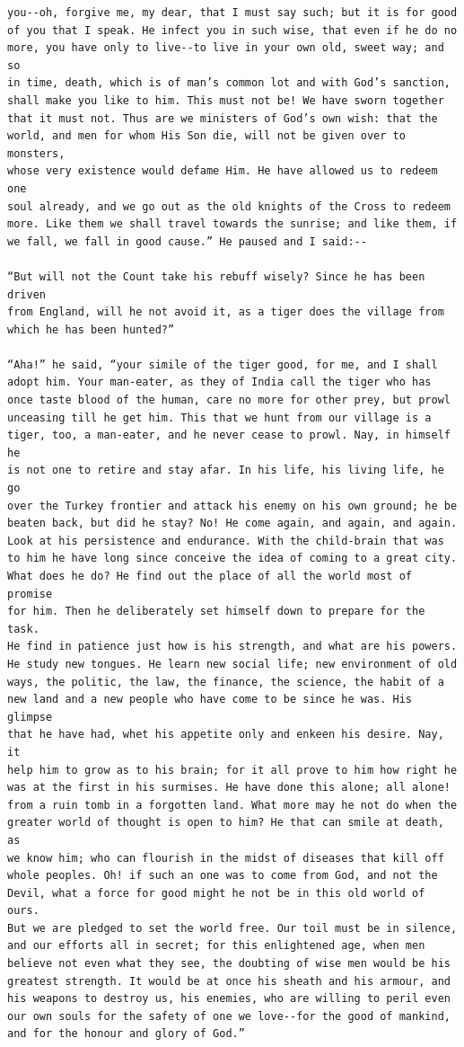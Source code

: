 \documentclass{article}
\begin{document}
\begin{verbatim}
you--oh, forgive me, my dear, that I must say such; but it is for good
of you that I speak. He infect you in such wise, that even if he do no
more, you have only to live--to live in your own old, sweet way; and so
in time, death, which is of man’s common lot and with God’s sanction,
shall make you like to him. This must not be! We have sworn together
that it must not. Thus are we ministers of God’s own wish: that the
world, and men for whom His Son die, will not be given over to monsters,
whose very existence would defame Him. He have allowed us to redeem one
soul already, and we go out as the old knights of the Cross to redeem
more. Like them we shall travel towards the sunrise; and like them, if
we fall, we fall in good cause.” He paused and I said:--

“But will not the Count take his rebuff wisely? Since he has been driven
from England, will he not avoid it, as a tiger does the village from
which he has been hunted?”

“Aha!” he said, “your simile of the tiger good, for me, and I shall
adopt him. Your man-eater, as they of India call the tiger who has
once taste blood of the human, care no more for other prey, but prowl
unceasing till he get him. This that we hunt from our village is a
tiger, too, a man-eater, and he never cease to prowl. Nay, in himself he
is not one to retire and stay afar. In his life, his living life, he go
over the Turkey frontier and attack his enemy on his own ground; he be
beaten back, but did he stay? No! He come again, and again, and again.
Look at his persistence and endurance. With the child-brain that was
to him he have long since conceive the idea of coming to a great city.
What does he do? He find out the place of all the world most of promise
for him. Then he deliberately set himself down to prepare for the task.
He find in patience just how is his strength, and what are his powers.
He study new tongues. He learn new social life; new environment of old
ways, the politic, the law, the finance, the science, the habit of a
new land and a new people who have come to be since he was. His glimpse
that he have had, whet his appetite only and enkeen his desire. Nay, it
help him to grow as to his brain; for it all prove to him how right he
was at the first in his surmises. He have done this alone; all alone!
from a ruin tomb in a forgotten land. What more may he not do when the
greater world of thought is open to him? He that can smile at death, as
we know him; who can flourish in the midst of diseases that kill off
whole peoples. Oh! if such an one was to come from God, and not the
Devil, what a force for good might he not be in this old world of ours.
But we are pledged to set the world free. Our toil must be in silence,
and our efforts all in secret; for this enlightened age, when men
believe not even what they see, the doubting of wise men would be his
greatest strength. It would be at once his sheath and his armour, and
his weapons to destroy us, his enemies, who are willing to peril even
our own souls for the safety of one we love--for the good of mankind,
and for the honour and glory of God.”


\end{verbatim}
\end{document}
